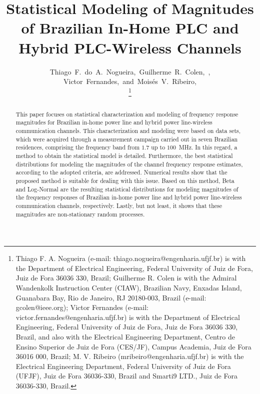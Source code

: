 \documentclass[journal]{IEEEtran}
\begin{document}

\title{Statistical Modeling of Magnitudes of Brazilian In-Home PLC and Hybrid PLC-Wireless Channels}

\author{Thiago~F.~do~A.~Nogueira,~Guilherme~R.~Colen,~,
	~Victor~Fernandes,~and~Mois\'{e}s~V.~Ribeiro,~

\thanks{Thiago F. A. Nogueira (e-mail: thiago.nogueira@engenharia.ufjf.br) is with the Department of Electrical Engineering, Federal University of Juiz de Fora, Juiz de Fora 36036 330, Brazil; Guilherme R. Colen is with the Admiral Wandenkolk Instruction Center (CIAW), Brazilian Navy, Enxadas Island, Guanabara Bay, Rio de Janeiro, RJ 20180-003, Brazil (e-mail: gcolen@ieee.org); Victor Fernandes (e-mail: victor.fernandes@engenharia.ufjf.br) is with the Department of Electrical Engineering, Federal University of Juiz de Fora, Juiz de Fora 36036 330, Brazil, and also with the Electrical Engineering Department, Centro de Ensino Superior de Juiz de Fora (CES/JF), Campus Academia, Juiz de Fora 36016 000, Brazil; M. V. Ribeiro (mribeiro@engenharia.ufjf.br) is with the Electrical Engineering Department, Federal University of Juiz de Fora (UFJF), Juiz de Fora 36036-330, Brazil and Smarti9 LTD., Juiz de Fora 36036-330, Brazil.}}


\maketitle

\begin{abstract}
This paper focuses on statistical characterization and modeling of frequency response magnitudes for Brazilian in-home power line and hybrid power line-wireless communication channels. This characterization and modeling were based on data sets, which were acquired through a measurement campaign carried out in seven Brazilian residences, comprising the frequency band from $1.7$ up to $100$~MHz. In this regard, a method to obtain the statistical model is detailed. Furthermore, the best statistical distributions for modeling the magnitudes of the channel frequency response estimates, according to the adopted criteria, are addressed. Numerical results show that the proposed method is suitable for dealing with this issue. Based on this method, Beta and Log-Normal are the resulting statistical distributions for modeling magnitudes of the frequency responses of Brazilian in-home power line and hybrid power line-wireless communication channels, respectively. Lastly, but not least, it shows that these magnitudes are non-stationary random processes.   

\end{abstract}
\end{document}
